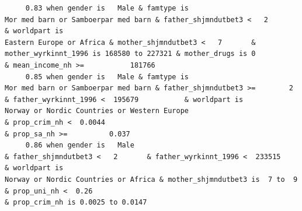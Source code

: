 \documentclass[
  letterpaper,
  DIV=11,
  numbers=noendperiod]{scrreprt}
\begin{document}
\begin{verbatim}
     0.83 when gender is   Male & famtype is                              Mor med barn or Samboerpar med barn & father_shjmndutbet3 <   2                                                  & worldpart is                                                                                                            Eastern Europe or Africa & mother_shjmndutbet3 <   7       & mother_wyrkinnt_1996 is 168580 to 227321 & mother_drugs is 0                                                         & mean_income_nh >=           181766                                                                                                                                                                                                                                                                                                                                            
     0.85 when gender is   Male & famtype is                              Mor med barn or Samboerpar med barn & father_shjmndutbet3 >=        2 & father_wyrkinnt_1996 <  195679           & worldpart is                                                                                        Norway or Nordic Countries or Western Europe                                                                                                                                                                                                                            & prop_crim_nh <  0.0044                                                                                                                  & prop_sa_nh >=          0.037                                                                                                                                      
     0.86 when gender is   Male                                                                               & father_shjmndutbet3 <   2       & father_wyrkinnt_1996 <  233515           & worldpart is                                                                                                Norway or Nordic Countries or Africa & mother_shjmndutbet3 is  7 to  9                                                                                          & prop_uni_nh <  0.26                                                                           & prop_crim_nh is 0.0025 to 0.0147                                                                                                                                                                                                                                                                            
\end{verbatim}
\end{document}
